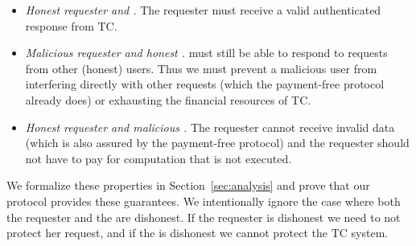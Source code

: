 \begin{itemize}
  \setlength{\itemsep}{2pt}
  \setlength{\parskip}{0pt}
  \setlength{\parsep}{0pt}
  \item {\it Honest requester and \medname.}
    The requester must receive a valid authenticated response from TC.

  \item {\it Malicious requester and honest \medname.}
    \tc must still be able to respond to requests from other (honest) users.
    Thus we must prevent a malicious user from interfering directly with other requests (which the payment-free protocol already does)
    or exhausting the financial resources of TC.

  \item {\it Honest requester and malicious \medname.}
    The requester cannot receive invalid data (which is also assured by the payment-free protocol)
    and the requester should not have to pay for computation that is not executed.
\end{itemize}
We formalize these properties in Section~\ref{sec:analysis} and prove that our protocol provides these guarantees.
We intentionally ignore the case where both the requester and the \medname are dishonest.
If the requester is dishonest we need to not protect her request, and if the \medname is dishonest we cannot protect the TC system.





